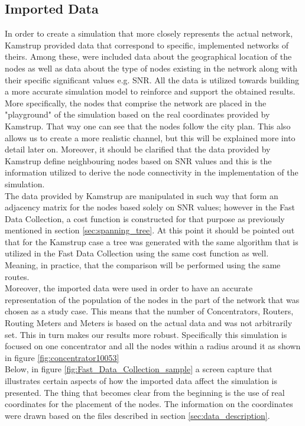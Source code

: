 \subsection{Imported Data}
In order to create a simulation that more closely represents the actual network, Kamstrup provided data that correspond to specific, implemented networks of theirs. Among these, were included data about the geographical location of the nodes as well as data about the type of nodes existing in the network along with their specific significant values e.g. SNR. All the data is utilized towards building a more accurate simulation model to reinforce and support the obtained results. \\
More specifically, the nodes that comprise the network are placed in the "playground" of the simulation based on the real coordinates provided by Kamstrup. That way one can see that the nodes follow the city plan. This also allows us to create a more realistic channel, but this will be explained more into detail later on. Moreover, it should be clarified that the data provided by Kamstrup define neighbouring nodes based on SNR values and this is the information utilized to derive the node connectivity in the implementation of the simulation.\\
The data provided by Kamstrup are manipulated in such way that form an adjacency matrix for the nodes based solely on SNR values; however in the Fast Data Collection, a cost function is constructed for that purpose as previously mentioned in section \ref{sec:spanning_tree}. At this point it should be pointed out that for the Kamstrup case a tree was generated with the same algorithm that is utilized in the Fast Data Collection using the same cost function as well. Meaning, in practice, that the comparison will be performed using the same routes. \\
Moreover, the imported data were used in order to have an accurate representation of the population of the nodes in the part of the network that was chosen as a study case. This means that the number of Concentrators, Routers, Routing Meters and Meters is based on the actual data and was not arbitrarily set. This in turn makes our results more robust. Specifically this simulation is focused on one concentrator and all the nodes within a radius around it as shown in figure \ref{fig:concentrator10053}\\
Below, in figure \ref{fig:Fast_Data_Collection_sample} a screen capture that illustrates certain aspects of how the imported data affect the simulation is presented. The thing that becomes clear from the beginning is the use of real coordinates for the placement of the nodes. The information on the coordinates were drawn based on the files described in section \ref{sec:data_description}.

